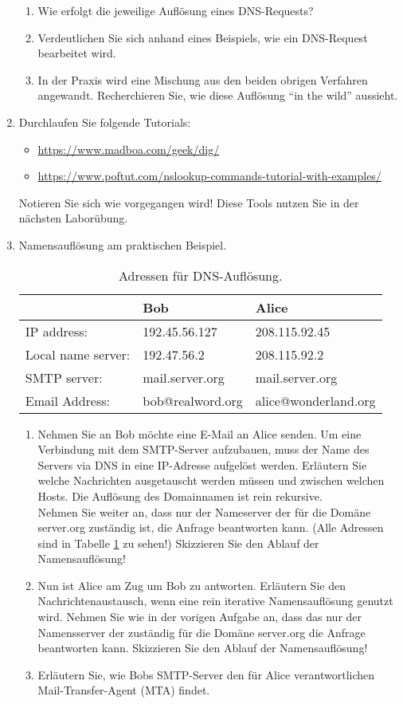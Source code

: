 \documentclass[paper=a4,fontsize=11pt]{scrartcl}%
\numberwithin{equation}{section}
\begin{document}
\begin{enumerate}
\begin{enumerate}
		\item Wie erfolgt die jeweilige Auflösung eines DNS-Requests?
		\item Verdeutlichen Sie sich anhand eines Beispiels, wie ein DNS-Request bearbeitet wird.
		\item In der Praxis wird eine Mischung aus den beiden obrigen Verfahren angewandt. Recherchieren Sie, wie diese Auflösung \enquote{in the wild} aussieht.
	\end{enumerate}
	\item Durchlaufen Sie folgende Tutorials:
	\begin{itemize}
	\item \url{https://www.madboa.com/geek/dig/}
	\item \url{https://www.poftut.com/nslookup-commands-tutorial-with-examples/}
	\end{itemize}
	Notieren Sie sich wie vorgegangen wird! Diese Tools nutzen Sie in der nächsten Laborübung.	
\item Namensauflösung am praktischen Beispiel.
\begin{table}[h]
\caption{Adressen für DNS-Auflösung.}
\label{dns_mail}
\centering
\begin{tabular}{lll}
\hline
 & Bob & Alice \\ \hline
 IP address: &  192.45.56.127 & 208.115.92.45\\
 Local name server:& 192.47.56.2 & 208.115.92.2\\
 SMTP server: & mail.server.org & mail.server.org\\
 Email Address: & bob@realword.org & alice@wonderland.org\\ \hline
\end{tabular}
\end{table}
	\begin{enumerate}
		\item Nehmen Sie an Bob möchte eine E-Mail an Alice senden. Um eine Verbindung mit dem SMTP-Server aufzubauen, muss der Name des Servers via DNS in eine IP-Adresse aufgelöst werden. Erläutern Sie welche Nachrichten ausgetauscht werden müssen und zwischen welchen Hosts. Die Auflösung des Domainnamen ist rein rekursive.\\
		Nehmen Sie weiter an, dass nur der Nameserver der für die Domäne server.org zuständig ist, die Anfrage beantworten kann. (Alle Adressen sind in Tabelle \ref{dns_mail} zu sehen!) Skizzieren Sie den Ablauf der Namensauflösung!
		\item Nun ist Alice am Zug um Bob zu antworten. Erläutern Sie den Nachrichtenaustausch, wenn eine rein iterative Namensauflösung genutzt wird. Nehmen Sie wie in der vorigen Aufgabe an, dass das nur der Namensserver der zuständig für die Domäne server.org die Anfrage beantworten kann. Skizzieren Sie den Ablauf der Namensauflösung!
		\item Erläutern Sie, wie Bobs SMTP-Server den für Alice verantwortlichen Mail-Transfer-Agent (MTA) findet.
	\end{enumerate}	
\end{enumerate}


\end{document}

